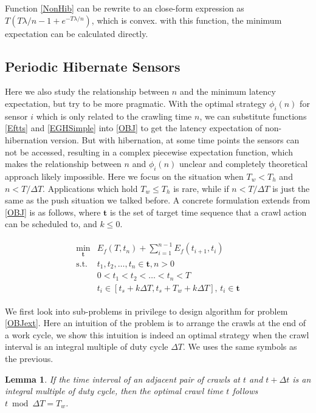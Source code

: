 \documentclass[conference]{IEEEtran}
\newtheorem{lemma}{Lemma}
\begin{document}
Function \eqref{NonHib} can be rewrite to an close-form expression as $T(T\lambda/n-1+e^{-T\lambda/n})$, which is convex. with this function, the minimum expectation can be calculated directly.

\subsection{Periodic Hibernate Sensors}

Here we also study the relationship between $n$ and the minimum latency expectation, but try to be more pragmatic.
With the optimal strategy $\phi_i(n)$ for sensor $i$ which is only related to the crawling time $n$, we can substitute functions \eqref{Eftts} and \eqref{EGHSimple} into \eqref{OBJ} to get the latency expectation of non-hibernation version. 
But with hibernation, at some time points the sensors can not be accessed, resulting in a complex piecewise expectation function, which makes the relationship between $n$ and $\phi_i(n)$ unclear and completely theoretical approach likely impossible.
Here we focus on the situation when $T_w<T_h$ and $n<T/\Delta T$. Applications which hold $T_w\leq T_h$ is rare, while if $n<T/\Delta T$ is just the same as the push situation we talked before.
A concrete formulation extends from \ref{OBJ} is as follows, where $\mathbf{t}$ is the set of target time sequence that a crawl action can be scheduled to, and $k\leq 0$.

\begin{eqnarray}
\begin{array}{ll}
\min_{\mathbf{t}}& E_f(T,t_n)+\sum_{i=1}^{n-1}E_f(t_{i+1},t_{i}) \\
\text{s.t.} 
&t_1,t_2,\ldots,t_n\in \mathbf{t}, n>0\\
&0<t_1<t_2<\ldots<t_n<T\\
&t_i\in[t_s+k \Delta T, t_s+T_w+k\Delta T]\text{, }t_i\in{\mathbf{t}}
\end{array}\label{OBJext}
\end{eqnarray}


We first look into sub-problems in privilege to design algorithm for problem \ref{OBJext}.
Here an intuition of the problem is to arrange the crawls at the end of a work cycle, we show this intuition is indeed an optimal strategy when the crawl interval is an integral multiple of duty cycle $\Delta T$. We uses the same symbols as the previous.

\begin{lemma}
\label{intopt}
If the time interval of an adjacent pair of crawls at $t$ and $t+\Delta t$ is an integral multiple of duty cycle, then the optimal crawl time $t$ follows $t\bmod \Delta T=T_w$.
\end{lemma}
\end{document}
